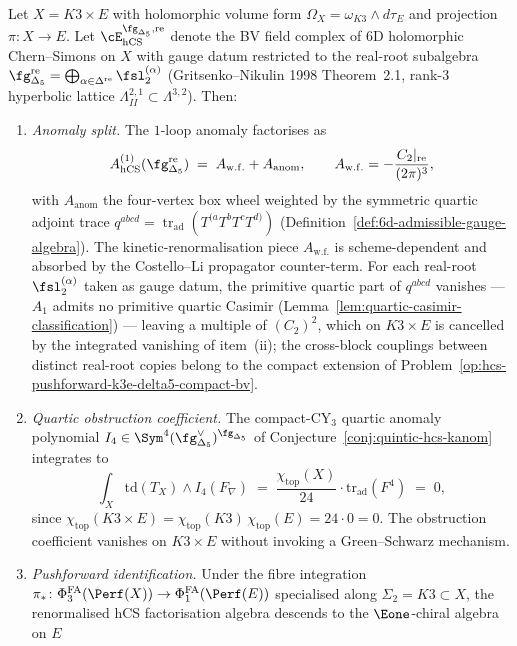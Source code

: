 \begin{proposition}
\label{prop:hcs-pushforward-k3e-delta5}
Let $X = K3 \times E$ with holomorphic volume form $\Omega_X = \omega_{K3} \wedge d\tau_E$ and projection $\pi \colon X \to E$. Let $\cE_{\hCS}^{\fg_{\Delta_5},\mathrm{re}}$ denote the BV field complex of $6$D holomorphic Chern--Simons on $X$ with gauge datum restricted to the real-root subalgebra $\fg_{\Delta_5}^{\mathrm{re}} = \bigoplus_{\alpha \in \Delta^{\mathrm{re}}} \fsl_2^{(\alpha)}$ (Gritsenko--Nikulin 1998 Theorem~2.1, rank-$3$ hyperbolic lattice $\Lambda^{2,1}_{II}\subset\Lambda^{3,2}$). Then:
\begin{enumerate}[label=\textup{(\roman*)}]
 \item \emph{Anomaly split.} The $1$-loop anomaly factorises as
 \[
 A_{\hCS}^{(1)}(\fg_{\Delta_5}^{\mathrm{re}}) \;=\; A_{\mathrm{w.f.}} + A_{\mathrm{anom}}, \qquad A_{\mathrm{w.f.}} = -\frac{C_2|_{\mathrm{re}}}{(2\pi)^3},
 \]
 with $A_{\mathrm{anom}}$ the four-vertex box wheel weighted by the
 symmetric quartic adjoint trace
 $q^{abcd} = \operatorname{tr}_{\mathrm{ad}}(T^{(a}T^bT^cT^{d)})$
 (Definition~\ref{def:6d-admissible-gauge-algebra}). The
 kinetic-renormalisation piece $A_{\mathrm{w.f.}}$ is scheme-dependent
 and absorbed by the Costello--Li propagator counter-term. For each
 real-root $\fsl_2^{(\alpha)}$ taken as gauge datum, the primitive
 quartic part of $q^{abcd}$ vanishes --- $A_1$ admits no primitive
 quartic Casimir
 (Lemma~\ref{lem:quartic-casimir-classification}) --- leaving a
 multiple of $(C_2)^2$, which on $K3 \times E$ is cancelled by the
 integrated vanishing of item~(ii); the cross-block couplings between
 distinct real-root copies belong to the compact extension of
 Problem~\ref{op:hcs-pushforward-k3e-delta5-compact-bv}.
 \item \emph{Quartic obstruction coefficient.} The compact-CY$_3$ quartic anomaly polynomial $I_4 \in \Sym^4(\fg_{\Delta_5}^\vee)^{\fg_{\Delta_5}}$ of Conjecture~\ref{conj:quintic-hcs-kanom} integrates to
 \[
 \int_X \mathrm{td}(T_X) \wedge I_4(F_{\nabla}) \;=\; \frac{\chi_{\mathrm{top}}(X)}{24} \cdot \mathrm{tr}_{\mathrm{ad}}(F^4) \;=\; 0,
 \]
 since $\chi_{\mathrm{top}}(K3 \times E) = \chi_{\mathrm{top}}(K3)\,\chi_{\mathrm{top}}(E) = 24 \cdot 0 = 0$. The obstruction coefficient vanishes on $K3 \times E$ without invoking a Green--Schwarz mechanism.
 \item \emph{Pushforward identification.} Under the fibre integration $\pi_* \colon \PhiFA_3(\Perf(X)) \to \PhiFA_1(\Perf(E))$ specialised along $\Sigma_2 = K3 \subset X$, the renormalised hCS factorisation algebra descends to the $\Eone$-chiral algebra on $E$

\end{enumerate}
\end{proposition}
